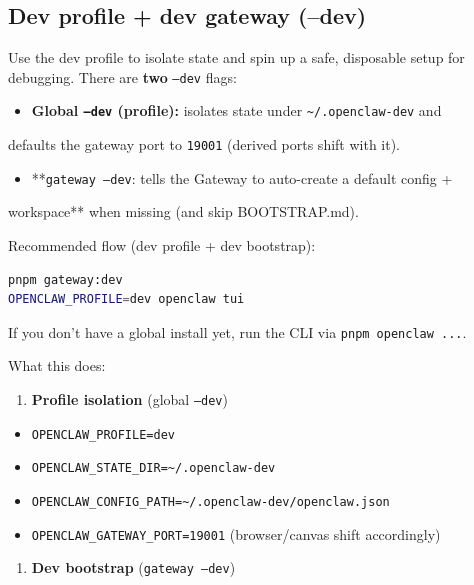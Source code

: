 \subsection{Dev profile + dev gateway (--dev)}


Use the dev profile to isolate state and spin up a safe, disposable setup for
debugging. There are \textbf{two} \texttt{--dev} flags:

\begin{itemize}
  \item \textbf{Global \texttt{--dev} (profile):} isolates state under \texttt{\textasciitilde{}/.openclaw-dev} and
\end{itemize}

defaults the gateway port to \texttt{19001} (derived ports shift with it).
\begin{itemize}
  \item **\texttt{gateway --dev}: tells the Gateway to auto-create a default config +
\end{itemize}

workspace** when missing (and skip BOOTSTRAP.md).

Recommended flow (dev profile + dev bootstrap):

\begin{lstlisting}[language=bash]
pnpm gateway:dev
OPENCLAW_PROFILE=dev openclaw tui
\end{lstlisting}


If you don’t have a global install yet, run the CLI via \texttt{pnpm openclaw ...}.

What this does:

\begin{enumerate}
  \item \textbf{Profile isolation} (global \texttt{--dev})
\end{enumerate}

\begin{itemize}
  \item \texttt{OPENCLAW\_PROFILE=dev}
  \item \texttt{OPENCLAW\_STATE\_DIR=\textasciitilde{}/.openclaw-dev}
  \item \texttt{OPENCLAW\_CONFIG\_PATH=\textasciitilde{}/.openclaw-dev/openclaw.json}
  \item \texttt{OPENCLAW\_GATEWAY\_PORT=19001} (browser/canvas shift accordingly)
\end{itemize}


\begin{enumerate}
  \item \textbf{Dev bootstrap} (\texttt{gateway --dev})
\end{enumerate}

